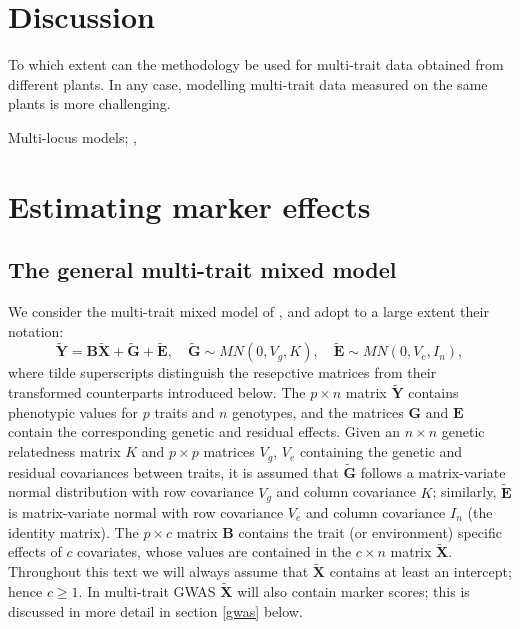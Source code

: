 \documentclass[12pt]{article}
\begin{document}
\section{Discussion}

To which extent can the methodology be used for multi-trait data obtained from different plants. In any case, modelling multi-trait data measured on the same plants is more challenging.

Multi-locus models; \cite{millet_etal_2016}, \cite{segura_etal_2012}

\appendix

\section{Estimating marker effects}


\subsection{The general multi-trait mixed model}

We consider the multi-trait mixed model of \cite{zhou_stephens_2014}, and adopt to a large extent their notation:
\begin{equation} \label{mtmm}
\mathbf{\tilde Y} = \mathbf{B}   \mathbf{\tilde X} + \mathbf{\tilde G} + \mathbf{\tilde E}, \quad \mathbf{\tilde G} \sim MN(0, V_g, K), \quad \mathbf{\tilde E} \sim MN(0, V_e, I_n),
\end{equation}
%
where tilde superscripts distinguish the resepctive matrices from their transformed counterparts introduced below. The $p \times n$ matrix $\mathbf{\tilde Y}$ contains phenotypic values for $p$ traits and $n$ genotypes, and the matrices $\mathbf{G}$ and $\mathbf{E}$ contain the corresponding genetic and residual effects. Given an $n \times n$ genetic relatedness matrix $K$ and $p \times p$ matrices $V_g$, $V_e$ containing the genetic and residual covariances between traits, it is assumed that $\mathbf{\tilde G}$ follows a matrix-variate normal distribution with row covariance $V_g$ and column covariance $K$; similarly, $\mathbf{\tilde E}$ is matrix-variate normal with row covariance $V_e$ and column covariance $I_n$ (the identity matrix). The $p \times c$ matrix $\mathbf{B}$ contains the trait (or environment) specific effects of $c$ covariates, whose values are contained in the $c \times n$ matrix $\mathbf{\tilde X}$.
Throughout this text we will always assume that $\mathbf{\tilde X}$ contains at least an intercept; hence $c \geq 1$. In multi-trait GWAS $\mathbf{\tilde X}$ will also contain marker scores; this is discussed in more detail in section \ref{gwas} below. 
\end{document}
